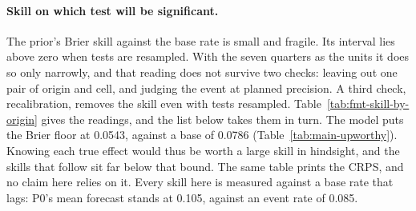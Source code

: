 \paragraph{Skill on which test will be significant.}
The prior's Brier skill against the base rate is small and fragile. Its interval lies above zero when tests are resampled. With the seven quarters as the units it does so only narrowly, and that reading does not survive two checks: leaving out one pair of origin and cell, and judging the event at planned precision. A third check, recalibration, removes the skill even with tests resampled. Table~\ref{tab:fmt-skill-by-origin} gives the readings, and the list below takes them in turn.
The model puts the Brier floor at 0.0543, against a base of 0.0786 (Table~\ref{tab:main-upworthy}). Knowing each true effect would thus be worth a large skill in hindsight, and the skills that follow sit far below that bound. The same table prints the CRPS, and no claim here relies on it.
Every skill here is measured against a base rate that lags: P0's mean forecast stands at 0.105, against an event rate of 0.085.
